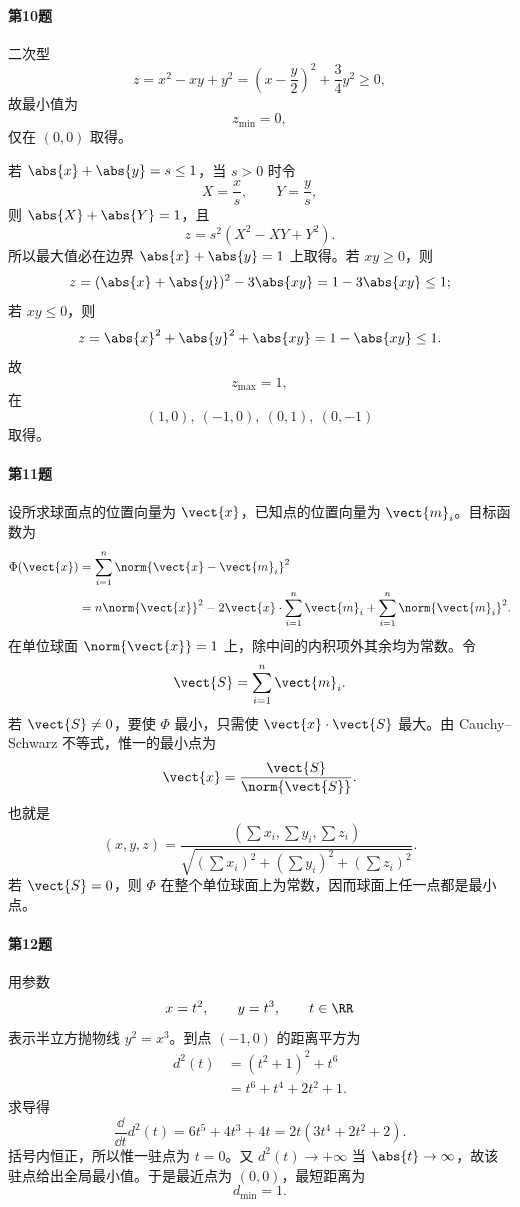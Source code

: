 \paragraph{第10题}
\begin{xsolution}
二次型
\[
  z=x^2-xy+y^2
  =\left(x-\frac y2\right)^2+\frac34y^2\ge0,
\]
故最小值为
\[
  z_{\min}=0,
\]
仅在 $(0,0)$ 取得。

若 $\abs{x}+\abs{y}=s\le1$，当 $s>0$ 时令
\[
  X=\frac xs,
  \qquad
  Y=\frac ys,
\]
则 $\abs{X}+\abs{Y}=1$，且
\[
  z=s^2(X^2-XY+Y^2).
\]
所以最大值必在边界 $\abs{x}+\abs{y}=1$ 上取得。若 $xy\ge0$，则
\[
  z=(\abs{x}+\abs{y})^2-3\abs{xy}=1-3\abs{xy}\le1;
\]
若 $xy\le0$，则
\[
  z=\abs{x}^2+\abs{y}^2+\abs{xy}
  =1-\abs{xy}\le1.
\]
故
\[
  z_{\max}=1,
\]
在
\[
  (1,0),\ (-1,0),\ (0,1),\ (0,-1)
\]
取得。
\end{xsolution}

\paragraph{第11题}
\begin{xsolution}
设所求球面点的位置向量为 $\vect{x}$，已知点的位置向量为 $\vect{m}_i$。目标函数为
\[
\begin{aligned}
  \Phi(\vect{x})
  &=\sum_{i=1}^n\norm{\vect{x}-\vect{m}_i}^2\\
  &=n\norm{\vect{x}}^2
  -2\vect{x}\cdot\sum_{i=1}^n\vect{m}_i
  +\sum_{i=1}^n\norm{\vect{m}_i}^2.
\end{aligned}
\]
在单位球面 $\norm{\vect{x}}=1$ 上，除中间的内积项外其余均为常数。令
\[
  \vect{S}=\sum_{i=1}^n\vect{m}_i.
\]
若 $\vect{S}\ne0$，要使 $\Phi$ 最小，只需使 $\vect{x}\cdot\vect{S}$ 最大。由 Cauchy--Schwarz 不等式，惟一的最小点为
\[
  \vect{x}=\frac{\vect{S}}{\norm{\vect{S}}}.
\]
也就是
\[
  (x,y,z)=
  \frac{\left(\sum x_i,\sum y_i,\sum z_i\right)}
  {\sqrt{(\sum x_i)^2+(\sum y_i)^2+(\sum z_i)^2}}.
\]
若 $\vect{S}=0$，则 $\Phi$ 在整个单位球面上为常数，因而球面上任一点都是最小点。
\end{xsolution}

\paragraph{第12题}
\begin{xsolution}
用参数
\[
  x=t^2,
  \qquad
  y=t^3,
  \qquad t\in\RR
\]
表示半立方抛物线 $y^2=x^3$。到点 $(-1,0)$ 的距离平方为
\[
\begin{aligned}
  d^2(t)
  &=(t^2+1)^2+t^6\\
  &=t^6+t^4+2t^2+1.
\end{aligned}
\]
求导得
\[
  \frac{\dd}{\dd t}d^2(t)
  =6t^5+4t^3+4t
  =2t(3t^4+2t^2+2).
\]
括号内恒正，所以惟一驻点为 $t=0$。又 $d^2(t)\to+\infty$ 当 $\abs{t}\to\infty$，故该驻点给出全局最小值。于是最近点为 $(0,0)$，最短距离为
\[
  d_{\min}=1.
\]
\end{xsolution}

